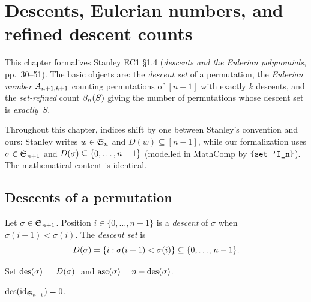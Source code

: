 \chapter{Descents, Eulerian numbers, and refined descent counts}
\label{ch:descents}

This chapter formalizes Stanley EC1 \S1.4 (\emph{descents and the
Eulerian polynomials}, pp.~30--51).  The basic objects are: the
\emph{descent set} of a permutation, the \emph{Eulerian number}
$A_{n+1,k+1}$ counting permutations of $[n+1]$ with exactly $k$
descents, and the \emph{set-refined} count $\beta_n(S)$ giving the
number of permutations whose descent set is \emph{exactly}~$S$.

\medskip
Throughout this chapter, indices shift by one between Stanley's
convention and ours: Stanley writes $w \in \mathfrak{S}_n$ and
$D(w) \subseteq [n-1]$, while our formalization uses
$\sigma \in \mathfrak{S}_{n+1}$ and $D(\sigma) \subseteq \{0, \dots, n-1\}$
(modelled in MathComp by $\texttt{\{set 'I\_n\}}$).  The mathematical
content is identical.

\section{Descents of a permutation}

\begin{definition}
  \label{def:descent_set}
  \rocqok
  Let $\sigma \in \mathfrak{S}_{n+1}$.  Position $i \in \{0, \dots, n-1\}$ is a
  \emph{descent} of $\sigma$ when $\sigma(i+1) < \sigma(i)$.  The
  \emph{descent set} is
  \[
    D(\sigma) = \{ i : \sigma(i+1) < \sigma(i) \}
                     \subseteq \{0, \dots, n-1\}.
  \]
\end{definition}

\begin{definition}
  \label{def:des_asc}
  \rocqok
  Set $\operatorname{des}(\sigma) = |D(\sigma)|$ and
  $\operatorname{asc}(\sigma) = n - \operatorname{des}(\sigma)$.
\end{definition}

\begin{lemma}
  \label{lem:des_id}
  \rocqok
  $\operatorname{des}(\mathrm{id}_{\mathfrak{S}_{n+1}}) = 0$.
\end{lemma}

